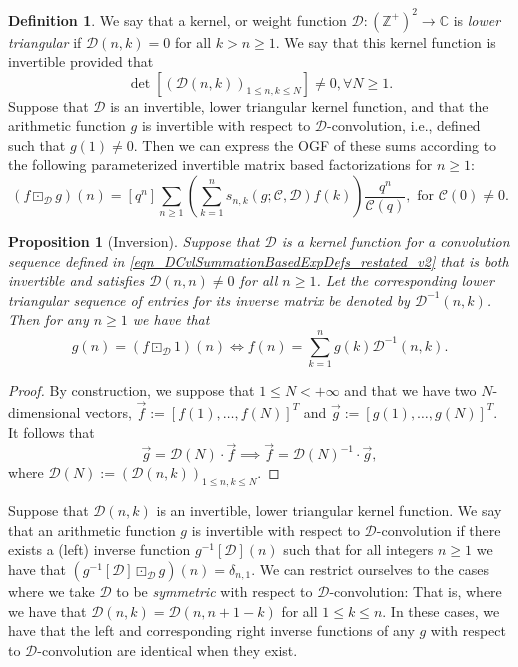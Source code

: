 \documentclass[12pt,reqno,a4letter]{article}
\numberwithin{figure}{section}
\numberwithin{table}{section}
\numberwithin{equation}{section}
\theoremstyle{plain}
\newtheorem{prop}[theorem]{Proposition}
\numberwithin{theorem}{section}
\theoremstyle{definition}
\newtheorem{definition}[theorem]{Definition}
\begin{document}
\begin{definition}
We say that a kernel, or weight function $\mathcal{D}: (\mathbb{Z}^{+})^2 \rightarrow \mathbb{C}$ is 
\emph{lower triangular} if $\mathcal{D}(n, k) = 0$ for all $k > n \geq 1$. 
We say that this kernel function is invertible provided that 
\[
\det\left[(\mathcal{D}(n,k))_{1 \leq n,k \leq N}\right] \neq 0, \forall N \geq 1. 
\]
Suppose that $\mathcal{D}$ is an invertible, lower triangular kernel function, 
and that the arithmetic function $g$ is invertible with respect to 
$\mathcal{D}$-convolution, i.e., defined such that $g(1) \neq 0$. Then we can express 
the OGF of these sums according to the following parameterized 
invertible matrix based factorizations for $n \geq 1$: 
\begin{equation}
\label{eqn_DCvlGenFactThmExp_restated_v2} 
(f \boxdot_{\mathcal{D}} g)(n) = [q^n] 
     \sum_{n \geq 1} \left(\sum_{k=1}^{n} s_{n,k}(g; \mathcal{C},\mathcal{D}) f(k) 
     \right) \frac{q^n}{\mathcal{C}(q)}, 
     \text{\ for\ } \mathcal{C}(0) \neq 0. 
\end{equation}
\end{definition}

\begin{prop}[Inversion]
Suppose that $\mathcal{D}$ is a kernel function for a convolution sequence defined in 
\eqref{eqn_DCvlSummationBasedExpDefs_restated_v2} 
that is both invertible and satisfies $\mathcal{D}(n,n) \neq 0$ for all $n \geq 1$. 
Let the corresponding lower triangular sequence of entries for its inverse matrix be denoted by 
$\mathcal{D}^{-1}(n,k)$. 
Then for any $n \geq 1$ we have that 
\[
g(n) = (f \boxdot_{\mathcal{D}} 1)(n) \iff f(n) = \sum_{k=1}^{n} g(k) \mathcal{D}^{-1}(n,k). 
\]
\end{prop}
\begin{proof}
By construction, we suppose that $1 \leq N < +\infty$ and that we have 
two $N$-dimensional vectors, $\vec{f} := [f(1), \ldots, f(N)]^{T}$ and 
$\vec{g} := [g(1), \ldots, g(N)]^{T}$. 
It follows that 
\[
\vec{g} = \mathcal{D}(N) \cdot \vec{f} \implies 
     \vec{f} = \mathcal{D}(N)^{-1} \cdot \vec{g}, 
\]
where $\mathcal{D}(N) := (\mathcal{D}(n, k))_{1 \leq n,k \leq N}$. 
\end{proof}

Suppose that $\mathcal{D}(n, k)$ is an invertible, lower triangular kernel function. 
We say that an arithmetic function $g$ is invertible with respect to $\mathcal{D}$-convolution 
if there exists a (left) inverse function $g^{-1}[\mathcal{D}](n)$ such that for all 
integers $n \geq 1$ we have that $(g^{-1}[\mathcal{D}] \boxdot_{\mathcal{D}} g)(n) = \delta_{n,1}$. 
We can restrict ourselves to the cases where we take $\mathcal{D}$ to be 
\emph{symmetric} with respect to $\mathcal{D}$-convolution:
That is, where we have that $\mathcal{D}(n, k) = \mathcal{D}(n, n+1-k)$ for all $1 \leq k \leq n$. 
In these cases, we have that the left and corresponding right inverse functions of any $g$ with respect to 
$\mathcal{D}$-convolution are identical when they exist.
\end{document}
